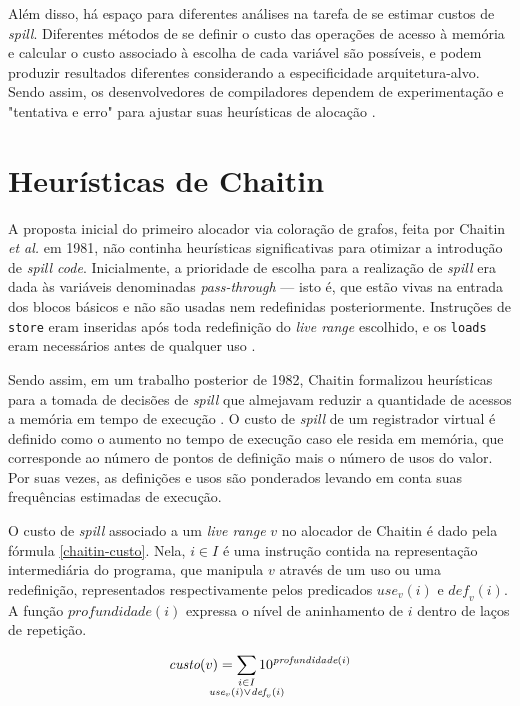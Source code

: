 \documentclass[
	12pt,				%
	openright,			%
	oneside,			%
	a4paper,			%
	tccpreliminar,			%
	]{ABNT-DC-UEL}
\begin{document}
Além disso, há espaço para diferentes análises na tarefa de se estimar custos de \textit{spill}. Diferentes métodos de se definir o custo das operações de acesso à memória e calcular o custo associado à escolha de cada variável são possíveis, e podem produzir resultados diferentes considerando a especificidade arquitetura-alvo. Sendo assim, os desenvolvedores de compiladores dependem de experimentação e "tentativa e erro" para ajustar suas heurísticas de alocação \cite{amarasinghe:03}.

\section{Heurísticas de Chaitin}

A proposta inicial do primeiro alocador via coloração de grafos, feita por Chaitin \textit{et al.} em 1981, não continha heurísticas significativas para otimizar a introdução de \textit{spill code}. Inicialmente, a prioridade de escolha para a realização de \textit{spill} era dada às variáveis denominadas \textit{pass-through} --- isto é, que estão vivas na entrada dos blocos básicos e não são usadas nem redefinidas posteriormente. Instruções de \texttt{store} eram inseridas após toda redefinição do \textit{live range} escolhido, e os \texttt{loads} eram necessários antes de qualquer uso \cite{chaitin:81}.

Sendo assim, em um trabalho posterior de 1982, Chaitin formalizou heurísticas para a tomada de decisões de \textit{spill} que almejavam reduzir a quantidade de acessos a memória em tempo de execução \cite{chaitin:82}. O custo de \textit{spill} de um registrador virtual é definido como o aumento no tempo de execução caso ele resida em memória, que corresponde ao número de pontos de definição mais o número de usos do valor. Por suas vezes, as definições e usos são ponderados levando em conta suas frequências estimadas de execução.

O custo de \textit{spill} associado a um \textit{live range} $v$ no alocador de Chaitin é dado pela fórmula \ref{chaitin-custo}. Nela, $i \in I$ é uma instrução contida na representação intermediária do programa, que manipula $v$ através de um uso ou uma redefinição, representados respectivamente pelos predicados $\textit{use}_v(i)$ e $\textit{def}_v(i)$. A função $\textit{profundidade} (i)$ expressa o nível de aninhamento de $i$ dentro de laços de repetição. 

\begin{equation}
    \textit{custo}(v) = \sum_{\mathclap{\substack{i \in I\\\textit{use}_v(i) \lor \textit{def}_v(i)}}} 10 ^ {\textit{profundidade}(i)}
    \label{chaitin-custo}
\end{equation}
\end{document}
